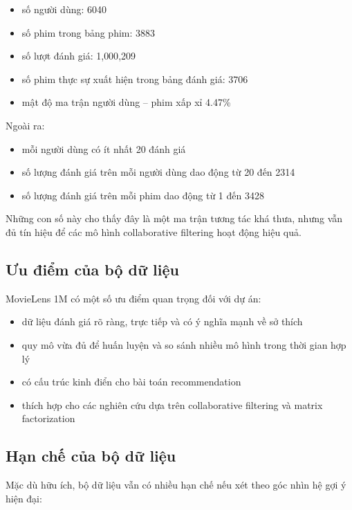 \documentclass[12pt,a4paper]{article}
\begin{document}
\begin{itemize}[leftmargin=1.5cm]
    \item số người dùng: 6040
    \item số phim trong bảng phim: 3883
    \item số lượt đánh giá: 1{,}000{,}209
    \item số phim thực sự xuất hiện trong bảng đánh giá: 3706
    \item mật độ ma trận người dùng -- phim xấp xỉ 4.47\%
\end{itemize}

Ngoài ra:

\begin{itemize}[leftmargin=1.5cm]
    \item mỗi người dùng có ít nhất 20 đánh giá
    \item số lượng đánh giá trên mỗi người dùng dao động từ 20 đến 2314
    \item số lượng đánh giá trên mỗi phim dao động từ 1 đến 3428
\end{itemize}

Những con số này cho thấy đây là một ma trận tương tác khá thưa, nhưng vẫn đủ tín hiệu để các mô hình collaborative filtering hoạt động hiệu quả.

\subsection{Ưu điểm của bộ dữ liệu}

MovieLens 1M có một số ưu điểm quan trọng đối với dự án:

\begin{itemize}[leftmargin=1.5cm]
    \item dữ liệu đánh giá rõ ràng, trực tiếp và có ý nghĩa mạnh về sở thích
    \item quy mô vừa đủ để huấn luyện và so sánh nhiều mô hình trong thời gian hợp lý
    \item có cấu trúc kinh điển cho bài toán recommendation
    \item thích hợp cho các nghiên cứu dựa trên collaborative filtering và matrix factorization
\end{itemize}

\subsection{Hạn chế của bộ dữ liệu}

Mặc dù hữu ích, bộ dữ liệu vẫn có nhiều hạn chế nếu xét theo góc nhìn hệ gợi ý hiện đại:
\end{document}
